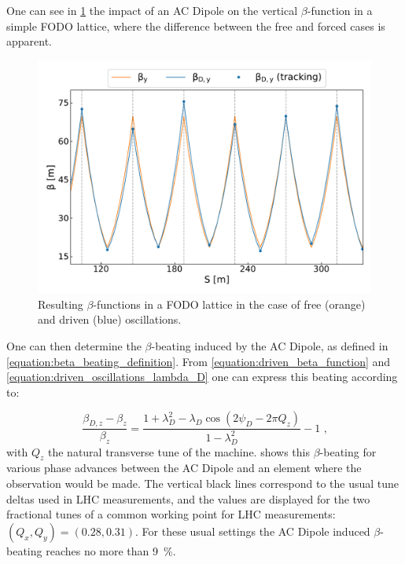 One can see in \cref{figure:acdipole_beta_functions_vs_nominal} the impact of an AC Dipole on the vertical \(\beta\)-function in a simple FODO lattice, where the difference between the free and forced cases is apparent.

\begin{figure}[!htb]
  \centering
  \includegraphics*[width=0.99\linewidth]{Figures/Optics_Measurements_Corrections_at_LHC/betas_nominal_vs_driven.pdf}
  \caption{Resulting \(\beta\)-functions in a FODO lattice in the case of free (\textcolor{mplorange}{orange}) and driven (\textcolor{mplblue}{blue}) oscillations.}
  \label{figure:acdipole_beta_functions_vs_nominal}
\end{figure}

One can then determine the \(\beta\)-beating induced by the AC Dipole, as defined in \cref{equation:beta_beating_definition}.
From \cref{equation:driven_beta_function} and \cref{equation:driven_oscillations_lambda_D} one can express this beating according to:

\begin{equation}
  \frac{\beta_{D,z} - \beta_z}{\beta_z} = \frac{1 + \lambda_D^2 - \lambda_D \cos \left(2 \psi_D - 2 \pi Q_z\right)}{1 - \lambda_D^2} - 1 \text{ ,}
  \label{equation:ac_dipole_beta_beating}
\end{equation}
with \(Q_z\) the natural transverse tune of the machine.
 shows this \(\beta\)-beating for various phase advances between the AC Dipole and an element where the observation would be made.
The vertical black lines correspond to the usual tune deltas used in LHC measurements, and the values are displayed for the two fractional tunes of a common working point for LHC measurements: \((Q_x, Q_y) = (0.28, 0.31)\).
For these usual settings the AC Dipole induced \(\beta\)-beating reaches no more than \qty{9}{\percent}.


